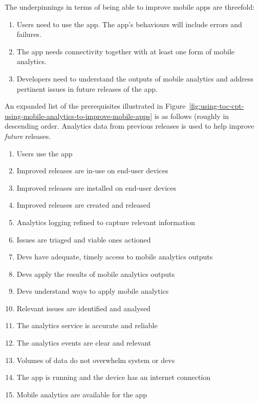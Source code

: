 %
The underpinnings in terms of being able to improve mobile apps are threefold: 
\begin{enumerate}
    \item Users need to use the app. The app's behaviours will include errors and failures.
    \item The app needs connectivity together with at least one form of mobile analytics.
    \item Developers need to understand the outputs of mobile analytics and address pertinent issues in future releases of the app.
\end{enumerate}

An expanded list of the prerequisites illustrated in Figure~\ref{fig:using-toc-cpt-using-mobile-analytics-to-improve-mobile-apps} is as follows (roughly in descending order. Analytics data from previous releases is used to help improve \emph{future} releases.

{\small
\begin{enumerate}
    \itemsep0em
    \item Users use the app
    \item Improved releases are in-use on end-user devices
    \item Improved releases are installed on end-user devices
    \item Improved releases are created and released
    \item Analytics logging refined to capture relevant information
    \item Issues are triaged and viable ones actioned
    \item Devs have adequate, timely access to mobile analytics outputs
    \item Devs apply the results of mobile analytics outputs
    \item Devs understand ways to apply mobile analytics
    \item Relevant issues are identified and analysed
    \item The analytics service is accurate and reliable
    \item The analytics events are clear and relevant
    \item Volumes of data do not overwhelm system or devs
    \item The app is running and the device has an internet connection
    \item Mobile analytics are available for the app
    \label{prerequisites-essential}
\end{enumerate}
}


